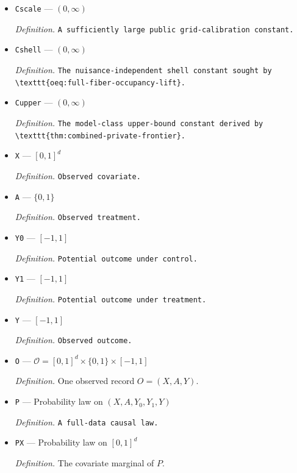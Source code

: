 \documentclass{article}
\begin{document}
\begin{itemize}
  \item \texttt{Cscale} --- \((0,\infty)\)
  \par\smallskip\noindent\emph{Definition.} \texttt{A sufficiently large public grid-\allowbreak{}calibration constant.}
  \item \texttt{Cshell} --- \((0,\infty)\)
  \par\smallskip\noindent\emph{Definition.} \texttt{The nuisance-\allowbreak{}independent shell constant sought by \textbackslash{}\allowbreak{}texttt\{oeq:\allowbreak{}full-\allowbreak{}fiber-\allowbreak{}occupancy-\allowbreak{}lift\}\allowbreak{}.}
  \item \texttt{Cupper} --- \((0,\infty)\)
  \par\smallskip\noindent\emph{Definition.} \texttt{The model-\allowbreak{}class upper-\allowbreak{}bound constant derived by \textbackslash{}\allowbreak{}texttt\{thm:\allowbreak{}combined-\allowbreak{}private-\allowbreak{}frontier\}\allowbreak{}.}
  \item \texttt{X} --- \([0,1]^d\)
  \par\smallskip\noindent\emph{Definition.} \texttt{Observed covariate.}
  \item \texttt{A} --- \(\{0,1\}\)
  \par\smallskip\noindent\emph{Definition.} \texttt{Observed treatment.}
  \item \texttt{Y0} --- \([-1,1]\)
  \par\smallskip\noindent\emph{Definition.} \texttt{Potential outcome under control.}
  \item \texttt{Y1} --- \([-1,1]\)
  \par\smallskip\noindent\emph{Definition.} \texttt{Potential outcome under treatment.}
  \item \texttt{Y} --- \([-1,1]\)
  \par\smallskip\noindent\emph{Definition.} \texttt{Observed outcome.}
  \item \texttt{O} --- \(\mathcal O=[0,1]^d\times\{0,1\}\times[-1,1]\)
  \par\smallskip\noindent\emph{Definition.} One observed record \(O=(X,A,Y)\).
  \item \texttt{P} --- Probability law on \((X,A,Y_0,Y_1,Y)\)
  \par\smallskip\noindent\emph{Definition.} \texttt{A full-\allowbreak{}data causal law.}
  \item \texttt{PX} --- Probability law on \([0,1]^d\)
  \par\smallskip\noindent\emph{Definition.} The covariate marginal of \(P\).

\end{itemize}
\end{document}

